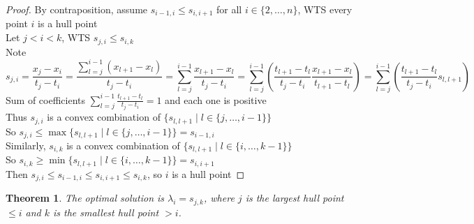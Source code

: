 \documentclass{article}
\newtheorem{theorem}{Theorem}
\begin{document}
\begin{proof}
  By contraposition, assume $s_{i-1,i} \leq s_{i,i+1}$ for all $i \in \{2, \ldots, n\}$,
  WTS every point $i$ is a hull point \\
  Let $j < i < k$, WTS $s_{j,i} \leq s_{i,k}$ \\
  Note
  \[
  s_{j,i} = \frac{x_j-x_i}{t_j-t_i}
  = \frac{\sum_{l=j}^{i-1}(x_{l+1}-x_l)}{t_j-t_i}
  = \sum_{l=j}^{i-1}\frac{x_{l+1}-x_l}{t_j-t_i}
  = \sum_{l=j}^{i-1}\left(
  \frac{t_{l+1}-t_l}{t_j-t_i}
  \frac{x_{l+1}-x_l}{t_{l+1}-t_l}
  \right)
  = \sum_{l=j}^{i-1}\left(
  \frac{t_{l+1}-t_l}{t_j-t_i}
  s_{l,l+1}
  \right)
  \]
  Sum of coefficients $\sum_{l=j}^{i-1}\frac{t_{l+1}-t_l}{t_j-t_i} = 1$
  and each one is positive \\
  Thus $s_{j,i}$ is a convex combination of $\{s_{l,l+1} \mid l \in \{j, \ldots, i-1\}\}$ \\
  So $s_{j,i} \leq \max\{s_{l,l+1} \mid l \in \{j, \ldots, i-1\}\} = s_{i-1,i}$ \\
  Similarly, $s_{i,k}$ is a convex combination of $\{s_{l,l+1} \mid l \in \{i, \ldots, k-1\}\}$ \\
  So $s_{i,k} \geq \min\{s_{l,l+1} \mid l \in \{i, \ldots, k-1\}\} = s_{i,i+1}$ \\
  Then $s_{j,i} \leq s_{i-1,i} \leq s_{i,i+1} \leq s_{i,k}$,
  so $i$ is a hull point
\end{proof}
\begin{theorem}
  The optimal solution is $\lambda_i = s_{j,k}$,
  where $j$ is the largest hull point $\leq i$ and $k$ is the smallest hull point $> i$.
\end{theorem}
\end{document}
